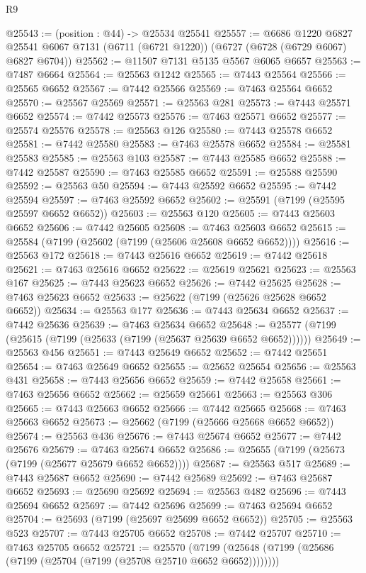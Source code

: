 \begin{lexlean}{R9}
\begin{coremodule}
@25543 := (position : @44) -> @25534 @25541
@25557 := @6686
    @1220
    @6827
    @25541
    @6067
    @7131
    (@6711 (@6721 @1220))
    (@6727 (@6728 (@6729 @6067) @6827 @6704))
@25562 := @11507 @7131 @5135 @5567 @6065 @6657
@25563 := @7487 @6664
@25564 := @25563 @1242
@25565 := @7443 @25564
@25566 := @25565 @6652
@25567 := @7442 @25566
@25569 := @7463 @25564 @6652
@25570 := @25567 @25569
@25571 := @25563 @281
@25573 := @7443 @25571 @6652
@25574 := @7442 @25573
@25576 := @7463 @25571 @6652
@25577 := @25574 @25576
@25578 := @25563 @126
@25580 := @7443 @25578 @6652
@25581 := @7442 @25580
@25583 := @7463 @25578 @6652
@25584 := @25581 @25583
@25585 := @25563 @103
@25587 := @7443 @25585 @6652
@25588 := @7442 @25587
@25590 := @7463 @25585 @6652
@25591 := @25588 @25590
@25592 := @25563 @50
@25594 := @7443 @25592 @6652
@25595 := @7442 @25594
@25597 := @7463 @25592 @6652
@25602 := @25591 (@7199 (@25595 @25597 @6652 @6652))
@25603 := @25563 @120
@25605 := @7443 @25603 @6652
@25606 := @7442 @25605
@25608 := @7463 @25603 @6652
@25615 := @25584 (@7199 (@25602 (@7199 (@25606 @25608 @6652 @6652))))
@25616 := @25563 @172
@25618 := @7443 @25616 @6652
@25619 := @7442 @25618
@25621 := @7463 @25616 @6652
@25622 := @25619 @25621
@25623 := @25563 @167
@25625 := @7443 @25623 @6652
@25626 := @7442 @25625
@25628 := @7463 @25623 @6652
@25633 := @25622 (@7199 (@25626 @25628 @6652 @6652))
@25634 := @25563 @177
@25636 := @7443 @25634 @6652
@25637 := @7442 @25636
@25639 := @7463 @25634 @6652
@25648 := @25577 (@7199 (@25615 (@7199 (@25633 (@7199 (@25637 @25639 @6652 @6652))))))
@25649 := @25563 @456
@25651 := @7443 @25649 @6652
@25652 := @7442 @25651
@25654 := @7463 @25649 @6652
@25655 := @25652 @25654
@25656 := @25563 @431
@25658 := @7443 @25656 @6652
@25659 := @7442 @25658
@25661 := @7463 @25656 @6652
@25662 := @25659 @25661
@25663 := @25563 @306
@25665 := @7443 @25663 @6652
@25666 := @7442 @25665
@25668 := @7463 @25663 @6652
@25673 := @25662 (@7199 (@25666 @25668 @6652 @6652))
@25674 := @25563 @436
@25676 := @7443 @25674 @6652
@25677 := @7442 @25676
@25679 := @7463 @25674 @6652
@25686 := @25655 (@7199 (@25673 (@7199 (@25677 @25679 @6652 @6652))))
@25687 := @25563 @517
@25689 := @7443 @25687 @6652
@25690 := @7442 @25689
@25692 := @7463 @25687 @6652
@25693 := @25690 @25692
@25694 := @25563 @482
@25696 := @7443 @25694 @6652
@25697 := @7442 @25696
@25699 := @7463 @25694 @6652
@25704 := @25693 (@7199 (@25697 @25699 @6652 @6652))
@25705 := @25563 @523
@25707 := @7443 @25705 @6652
@25708 := @7442 @25707
@25710 := @7463 @25705 @6652
@25721 := @25570
    (@7199 (@25648 (@7199 (@25686 (@7199 (@25704 (@7199 (@25708 @25710 @6652 @6652))))))))

\end{coremodule}
\end{lexlean}
